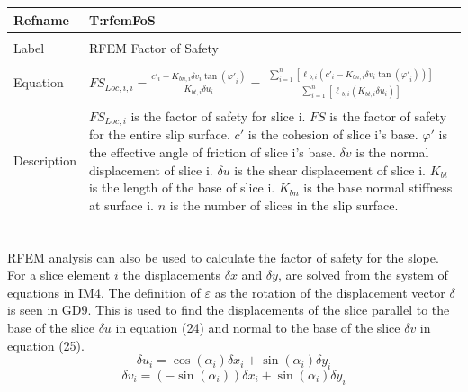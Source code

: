 \documentclass[12pt]{article}
\begin{document}
\noindent \begin{minipage}{\textwidth}
\begin{tabular}{p{} p{}}
\toprule \textbf{Refname} & \textbf{T:rfemFoS}
\label{T:rfemFoS}
\\ \midrule \\
Label & RFEM Factor of Safety
\\ \midrule \\
Equation & ${FS_{Loc,i,i}}=\frac{{c'}_{i}-{K_{bn,i}} {\delta{}v}_{i} \tan\left({\varphi{}'}_{i}\right)}{{K_{bt,i}} {\delta{}u}_{i}}=\frac{\begin{multlined}
\displaystyle\sum_{i=1}^{n}{\left[{\ell{}_{b,i}} \left({c'}_{i}-{K_{bn,i}} {\delta{}v}_{i} \tan\left({\varphi{}'}_{i}\right)\right)\right]}
\end{multlined}
}{\displaystyle\sum_{i=1}^{n}{\left[{\ell{}_{b,i}} \left({K_{bt,i}} {\delta{}u}_{i}\right)\right]}}$
\\ \midrule \\
Description & ${FS_{Loc,i}}$ is the factor of safety for slice i. $FS$ is the factor of safety for the entire slip surface. $c'$ is the cohesion of slice i's base. $\varphi{}'$ is the effective angle of friction of slice i's base. $\delta{}v$ is the normal displacement of slice i. $\delta{}u$ is the shear displacement of slice i. ${K_{bt}}$ is the length of the base of slice i. ${K_{bn}}$ is the base normal stiffness at surface i. $n$ is the number of slices in the slip surface.
\\ \bottomrule \end{tabular}
\end{minipage}\\
RFEM analysis can also be used to calculate the factor of safety for the slope. For a slice element $i$ the displacements $\delta{}x$ and $\delta{}y$, are solved from the system of equations in IM4. The definition of $\varepsilon{}$ as the rotation of the displacement vector $\delta{}$ is seen in GD9. This is used to find the displacements of the slice parallel to the base of the slice $\delta{}u$ in equation (24) and normal to the base of the slice $\delta{}v$ in equation (25).
\begin{dmath}
{\delta{}u}_{i}=\cos\left(\alpha{}_{i}\right) {\delta{}x}_{i}+\sin\left(\alpha{}_{i}\right) {\delta{}y}_{i}
\end{dmath}
\begin{dmath}
{\delta{}v}_{i}=\left(-\sin\left(\alpha{}_{i}\right)\right) {\delta{}x}_{i}+\sin\left(\alpha{}_{i}\right) {\delta{}y}_{i}
\end{dmath}
\end{document}
